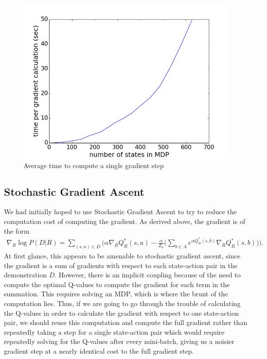 \documentclass[10pt,a4paper]{article}
\begin{document}
\begin{figure}
\centering
\includegraphics[scale=0.4]{figs/ave_run_time.png}
\caption{Average time to compute a single gradient step }
\label{fig:run_time_gd}
\end{figure}

\subsection{Stochastic Gradient Ascent}
We had initially hoped to use Stochastic Gradient Ascent to try to reduce the computation cost of computing the gradient. As derived above, the gradient is of the form 
\begin{eqnarray}
\nabla_R \log P(D | R) = \sum_{(s,a) \in D} \bigg(\alpha \nabla_R Q_R^*(s,a) - \frac{\alpha}{Z_a}\bigg(\sum_{b \in A} e^{\alpha Q_R^*(s,b)} \nabla_R Q_R^*(s,b)\bigg) \bigg).
\end{eqnarray}
At first glance, this appears to be amenable to stochastic gradient ascent, since the gradient is a sum of gradients with respect to each state-action pair in the demonstration $D$. However, there is an implicit coupling because of the need to compute the optimal Q-values to compute the gradient for each term in the summation. This requires solving an MDP, which is where the brunt of the computation lies. Thus, if we are going to go through the trouble of calculating the Q-values in order to calculate the gradient with respect to one state-action pair, we should reuse this computation and compute the full gradient rather than repeatedly taking a step for a single state-action pair which would require repeatedly solving for the Q-values after every mini-batch, giving us a noisier gradient step at a nearly identical cost to the full gradient step.
\end{document}
